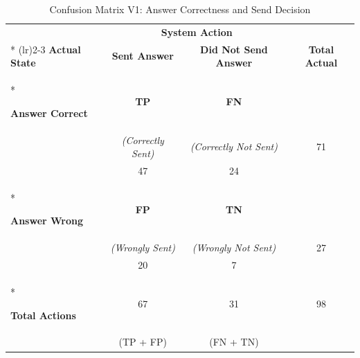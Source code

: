 \begin{longtable}{l|cc|c}

\caption[Confusion Matrix V1: Answer Correctness and Send Decision]{
    Confusion Matrix V1: Answer Correctness and Send Decision
} \label{tab:correctness_dispatch_cm_v1} \\

\toprule
\multicolumn{1}{c}{} & \multicolumn{2}{c}{\textbf{System Action}} & \multicolumn{1}{c}{} \\*
\cmidrule(lr){2-3}
\textbf{Actual State} & \textbf{Sent Answer} & \textbf{Did Not Send Answer} & \textbf{Total Actual} \\*
\midrule
\endfirsthead

\textbf{Answer Correct} & \textbf{TP} & \textbf{FN} & \\
                      & \textit{(Correctly Sent)} & \textit{(Correctly Not Sent)} & 71 \\
                      & 47 & 24 & \\*
\midrule

\textbf{Answer Wrong} & \textbf{FP} & \textbf{TN} & \\
                     & \textit{(Wrongly Sent)} & \textit{(Wrongly Not Sent)} & 27 \\
                     & 20 & 7 & \\*
\midrule

\textbf{Total Actions} & 67 & 31 & 98 \\
                       & (TP + FP) & (FN + TN) & \\

\end{longtable}

\makeatletter
\let\@currsize\normalsize
\makeatother

